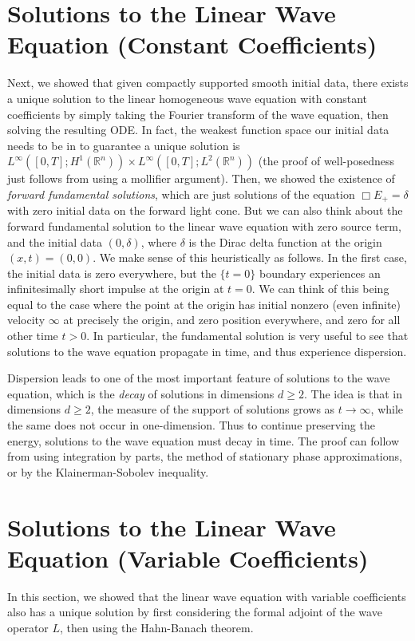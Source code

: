 \documentclass{article}
\begin{document}
	\section{Solutions to the Linear Wave Equation (Constant Coefficients)}
	Next, we showed that given compactly supported smooth initial data, there exists a unique solution to the linear homogeneous wave equation with constant coefficients by simply taking the Fourier transform of the wave equation, then solving the resulting ODE. In fact, the weakest function space our initial data needs to be in to guarantee a unique solution is $L^{\infty}([0,T]; H^{1}(\mathbb{R}^{n})) \times L^{\infty}([0,T]; L^{2}(\mathbb{R}^{n}))$ (the proof of well-posedness just follows from using a mollifier argument). Then, we showed the existence of \textit{forward fundamental solutions}, which are just solutions of the equation $\Box E_{+} = \delta$ with zero initial data on the forward light cone. But we can also think about the forward fundamental solution to the linear wave equation with zero source term, and the initial data $(0, \delta)$, where $\delta$ is the Dirac delta function at the origin $(x,t) = (0,0)$. We make sense of this heuristically as follows. In the first case, the initial data is zero everywhere, but the $\{t = 0\}$ boundary experiences an infinitesimally short impulse at the origin at $t = 0$. We can think of this being equal to the case where the point at the origin has initial nonzero (even infinite) velocity $\infty$ at precisely the origin, and zero position everywhere, and zero for all other time $t > 0$. In particular, the fundamental solution is very useful to see that solutions to the wave equation propagate in time, and thus experience dispersion. 
	
	Dispersion leads to one of the most important feature of solutions to the wave equation, which is the \textit{decay} of solutions in dimensions $d \geq 2$. The idea is that in dimensions $d \geq 2$, the measure of the support of solutions grows as $t \to \infty$, while the same does not occur in one-dimension. Thus to continue preserving the energy, solutions to the wave equation must decay in time. The proof can follow from using integration by parts, the method of stationary phase approximations, or by the Klainerman-Sobolev inequality. 
	
	\section{Solutions to the Linear Wave Equation (Variable Coefficients)} 
	In this section, we showed that the linear wave equation with variable coefficients also has a unique solution by first considering the formal adjoint of the wave operator $L$,  then using the Hahn-Banach theorem.
	
\end{document}
